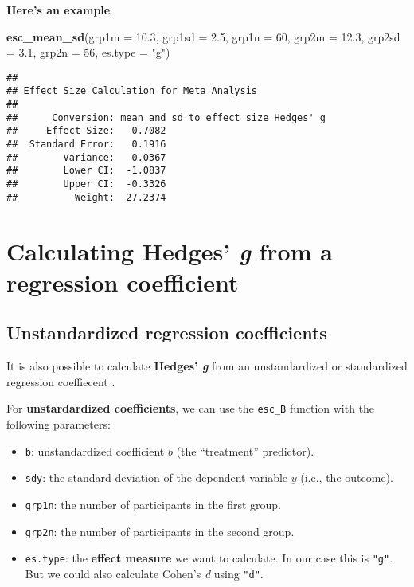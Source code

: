 \documentclass[]{book}
\newenvironment{Shaded}{\begin{snugshade}}{\end{snugshade}}
\newcommand{\KeywordTok}[1]{\textcolor[rgb]{0.13,0.29,0.53}{\textbf{#1}}}
\newcommand{\DataTypeTok}[1]{\textcolor[rgb]{0.13,0.29,0.53}{#1}}
\newcommand{\DecValTok}[1]{\textcolor[rgb]{0.00,0.00,0.81}{#1}}
\newcommand{\FloatTok}[1]{\textcolor[rgb]{0.00,0.00,0.81}{#1}}
\newcommand{\StringTok}[1]{\textcolor[rgb]{0.31,0.60,0.02}{#1}}
\newcommand{\NormalTok}[1]{#1}
\providecommand{\tightlist}{%
  \setlength{\itemsep}{0pt}\setlength{\parskip}{0pt}}
\theoremstyle{definition}
\theoremstyle{definition}
\theoremstyle{definition}
\theoremstyle{remark}
\begin{document}
\textbf{Here's an example}

\begin{Shaded}
\begin{Highlighting}[]
\KeywordTok{esc_mean_sd}\NormalTok{(}\DataTypeTok{grp1m =} \FloatTok{10.3}\NormalTok{, }\DataTypeTok{grp1sd =} \FloatTok{2.5}\NormalTok{, }\DataTypeTok{grp1n =} \DecValTok{60}\NormalTok{,}
\DataTypeTok{grp2m =} \FloatTok{12.3}\NormalTok{, }\DataTypeTok{grp2sd =} \FloatTok{3.1}\NormalTok{, }\DataTypeTok{grp2n =} \DecValTok{56}\NormalTok{, }\DataTypeTok{es.type =} \StringTok{"g"}\NormalTok{)}
\end{Highlighting}
\end{Shaded}

\begin{verbatim}
## 
## Effect Size Calculation for Meta Analysis
## 
##      Conversion: mean and sd to effect size Hedges' g
##     Effect Size:  -0.7082
##  Standard Error:   0.1916
##        Variance:   0.0367
##        Lower CI:  -1.0837
##        Upper CI:  -0.3326
##          Weight:  27.2374
\end{verbatim}

\hypertarget{b}{\section{\texorpdfstring{Calculating Hedges' \emph{g}
from a regression
coefficient}{Calculating Hedges' g from a regression coefficient}}\label{b}}

\subsection{Unstandardized regression
coefficients}\label{unstandardized-regression-coefficients}

It is also possible to calculate \textbf{Hedges' \emph{g} } from an
unstandardized or standardized regression coeffiecent
\citep{lipsey2001practical}.

For \textbf{unstardardized coefficients}, we can use the \texttt{esc\_B}
function with the following parameters:

\begin{itemize}
\tightlist
\item
  \texttt{b}: unstandardized coefficient \(b\) (the ``treatment''
  predictor).
\item
  \texttt{sdy}: the standard deviation of the dependent variable \(y\)
  (i.e., the outcome).
\item
  \texttt{grp1n}: the number of participants in the first group.
\item
  \texttt{grp2n}: the number of participants in the second group.
\item
  \texttt{es.type}: the \textbf{effect measure} we want to calculate. In
  our case this is \texttt{"g"}. But we could also calculate Cohen's
  \emph{d} using \texttt{"d"}.
\end{itemize}
\end{document}
